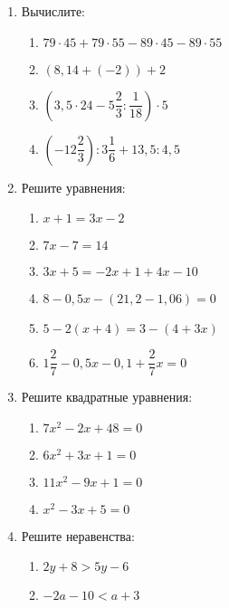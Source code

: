 \documentclass[12pt, a4paper]{article}
\begin{document}
	
	\begin{enumerate}
				\item \textit{} Вычислите:
				\begin{multicols}{2}
					\begin{enumerate}[label=\asbuk*)]
						\item $79 \cdot 45 + 79 \cdot 55 - 89 \cdot 45 - 89 \cdot 55$
						\item $(8,14+(-2))+2$
						\item $\left( 3,5 \cdot 24 - 5\dfrac{2}{3} : \dfrac{1}{18}\right) \cdot 5 $
						\item $\left( -12\dfrac{2}{3}\right):3\dfrac{1}{6} +13,5:4,5$
					\end{enumerate}
				\end{multicols}
				\item \textit{} Решите уравнения:
				\begin{multicols}{2}
					\begin{enumerate}[label=\asbuk*)]
						\item $x+1=3x-2$
						\item $7x-7=14$
						\item $3x+5=-2x+1+4x-10$
						\item $8-0,5x-(21,2-1,06)=0$
						\item $5-2(x+4)=3-(4+3x)$
						\item $1\dfrac{2}{7}-0,5x-0,1+\dfrac{2}{7}x=0$
					\end{enumerate}
				\end{multicols}
				\item \textit{} Решите квадратные уравнения:
				\begin{multicols}{2}
					\begin{enumerate}[label=\asbuk*)]
						\item $7x^2-2x+48=0$
						\item $6x^2+3x+1=0$
						\item $11x^2-9x+1=0$
						\item $x^2-3x+5=0$
					\end{enumerate}
				\end{multicols}
				\item \textit{} Решите неравенства:
				\begin{multicols}{2}
					\begin{enumerate}[label=\asbuk*)]
						\item $2y+8>5y-6$
						\item $-2a-10<a+3$

\end{enumerate}
\end{multicols}
\end{enumerate}
\end{document}
